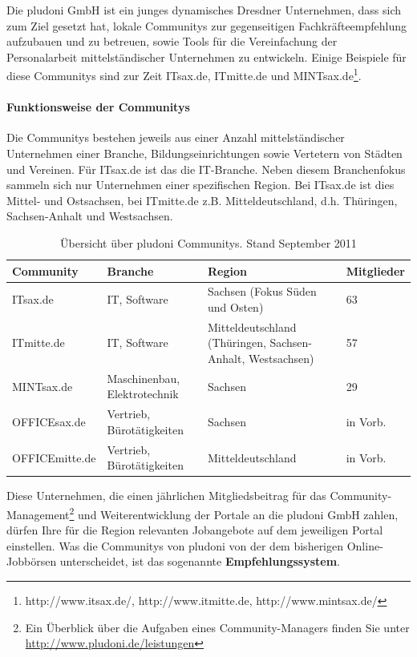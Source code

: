 Die pludoni GmbH ist ein junges dynamisches Dresdner Unternehmen, dass sich zum Ziel gesetzt hat, lokale Communitys zur gegenseitigen Fachkräfteempfehlung aufzubauen und zu betreuen, sowie Tools für die Vereinfachung der Personalarbeit mittelständischer Unternehmen zu entwickeln. Einige Beispiele für diese Communitys sind zur Zeit ITsax.de, ITmitte.de und MINTsax.de\footnote{http://www.itsax.de/, http://www.itmitte.de, http://www.mintsax.de/}.
\paragraph{Funktionsweise der Communitys}
Die Communitys bestehen jeweils aus einer Anzahl mittelständischer Unternehmen einer Branche, Bildungseinrichtungen sowie Vertetern von Städten und Vereinen. Für ITsax.de ist das die IT-Branche. Neben diesem Branchenfokus sammeln sich nur Unternehmen einer spezifischen Region. Bei ITsax.de ist dies Mittel- und Ostsachsen, bei ITmitte.de z.B. Mitteldeutschland, d.h. Thüringen, Sachsen-Anhalt und Westsachsen. 
\begin{table}[htbp]
\label{tb:dt}
\caption{Übersicht über pludoni Communitys. Stand September 2011}
\begin{tabular}{|l|p{2.8cm}|p{5cm}|l|}
\hline
\rowcolor{Gray}
Community & Branche & Region & Mitglieder \\\hline
ITsax.de & IT, Software &  Sachsen (Fokus Süden und Osten) & 63\\\hline
ITmitte.de & IT, Software &  Mitteldeutschland (Thüringen, Sachsen-Anhalt, Westsachsen) & 57 \\\hline
MINTsax.de & Maschinenbau, Elektrotechnik &  Sachsen & 29\\\hline
OFFICEsax.de & Vertrieb, Bürotätigkeiten &  Sachsen & in Vorb.\\\hline
OFFICEmitte.de & Vertrieb, Bürotätigkeiten &  Mitteldeutschland & in Vorb.\\\hline
\end{tabular}
\end{table}

Diese Unternehmen, die einen jährlichen Mitgliedsbeitrag für das Community-Management\footnote{Ein Überblick über die Aufgaben eines Community-Managers finden Sie unter \url{http://www.pludoni.de/leistungen}} und Weiterentwicklung der Portale an die pludoni GmbH zahlen, dürfen Ihre für die Region relevanten Jobangebote auf dem jeweiligen Portal einstellen. Was die Communitys von pludoni von der dem bisherigen Online-Jobbörsen unterscheidet, ist das sogenannte \textbf{Empfehlungssystem}. 

